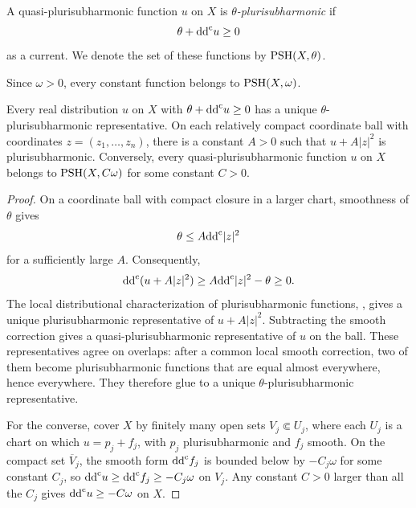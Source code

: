 \begin{definition}\label{def:theta-psh}
A quasi-plurisubharmonic function $u$ on $X$ is \emph{$\theta$-plurisubharmonic} if
\[
 \theta+\mathrm{dd}^{\mathrm{c}} u\geq0
\]
as a current. We denote the set of these functions by $\mathrm{PSH}(X,\theta)$.
\end{definition}

Since $\omega>0$, every constant function belongs to $\mathrm{PSH}(X,\omega)$.

\begin{proposition}\label{prop:local-correction}
Every real distribution $u$ on $X$ with $\theta+\mathrm{dd}^{\mathrm{c}} u\geq0$ has a unique $\theta$-plurisubharmonic representative. On each relatively compact coordinate ball with coordinates $z=(z_1,\ldots,z_n)$, there is a constant $A>0$ such that $u+A|z|^2$ is plurisubharmonic.
Conversely, every quasi-plurisubharmonic function $u$ on $X$ belongs to $\mathrm{PSH}(X,C\omega)$ for some constant $C>0$.
\end{proposition}
\begin{proof}
On a coordinate ball with compact closure in a larger chart, smoothness of $\theta$ gives
\[
 \theta\leq A\mathrm{dd}^{\mathrm{c}}|z|^2
\]
for a sufficiently large $A$. Consequently,
\[
 \mathrm{dd}^{\mathrm{c}}(u+A|z|^2)\geq A\mathrm{dd}^{\mathrm{c}}|z|^2-\theta\geq0.
\]
The local distributional characterization of plurisubharmonic functions, \cite[Chapter~I, Theorem~5.8]{DemCADG}, gives a unique plurisubharmonic representative of $u+A|z|^2$. Subtracting the smooth correction gives a quasi-plurisubharmonic representative of $u$ on the ball. These representatives agree on overlaps: after a common local smooth correction, two of them become plurisubharmonic functions that are equal almost everywhere, hence everywhere. They therefore glue to a unique $\theta$-plurisubharmonic representative.

For the converse, cover $X$ by finitely many open sets $V_j\Subset U_j$, where each $U_j$ is a chart on which $u=p_j+f_j$, with $p_j$ plurisubharmonic and $f_j$ smooth. On the compact set $\overline V_j$, the smooth form $\mathrm{dd}^{\mathrm{c}} f_j$ is bounded below by $-C_j\omega$ for some constant $C_j$, so $\mathrm{dd}^{\mathrm{c}} u\geq\mathrm{dd}^{\mathrm{c}} f_j\geq-C_j\omega$ on $V_j$. Any constant $C>0$ larger than all the $C_j$ gives $\mathrm{dd}^{\mathrm{c}} u\geq-C\omega$ on $X$.
\end{proof}

